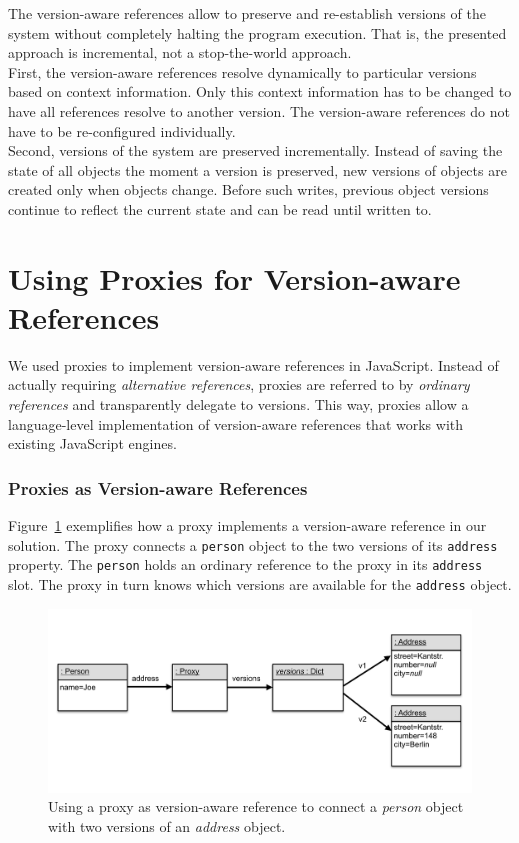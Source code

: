 The version-aware references allow to preserve and re-establish versions of the system without completely halting the program execution.
That is, the presented approach is incremental, not a stop-the-world approach.\\
First, the version-aware references resolve dynamically to particular versions based on context information.
Only this context information has to be changed to have all references resolve to another version.
The version-aware references do not have to be re-configured individually.\\
Second, versions of the system are preserved incrementally.
Instead of saving the state of all objects the moment a version is preserved, new versions of objects are created only when objects change.
Before such writes, previous object versions continue to reflect the current state and can be read until written to.


\section{Using Proxies for Version-aware References} \label{sec:APPROACH:2}

We used proxies to implement version-aware references in JavaScript.
Instead of actually requiring \emph{alternative references}, proxies are referred to by \emph{ordinary references} and transparently delegate to versions. 
This way, proxies allow a language-level implementation of version-aware references that works with existing JavaScript engines.

\subsubsection{Proxies as Version-aware References}

Figure~\ref{fig:ProxyBasedVersionAwareReference} exemplifies how a proxy implements a version-aware reference in our solution.
The proxy connects a \lstinline{person} object to the two versions of its \lstinline{address} property.
The \lstinline{person} holds an ordinary reference to the proxy in its \lstinline{address} slot.
The proxy in turn knows which versions are available for the \lstinline{address} object.

\begin{figure}[h]
    \centering
    \includegraphics[width=\textwidth]{figures/4_approach/7_proxyBasedVersionAwareReference.pdf}
    \caption{Using a proxy as version-aware reference to connect a \emph{person} object with two versions of an \emph{address} object.}
    \label{fig:ProxyBasedVersionAwareReference}
\end{figure}

